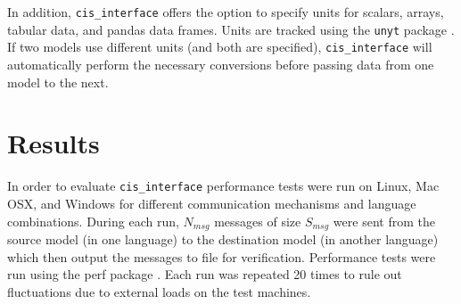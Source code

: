 \documentclass[journal]{IEEEtran}
\newcommand{\cis}{{\tt cis\_interface}{}}
\begin{document}
%
In addition, {\cis} offers the option to specify units for scalars, arrays, tabular data, and pandas data frames. Units are tracked using the {\tt unyt} package \citep{Goldbaum2018}. If two models use different units (and both are specified), {\cis} will automatically perform the necessary conversions before passing data from one model to the next.

\section{Results}\label{S:results}
%
In order to evaluate {\cis} performance tests were run on Linux, Mac OSX, and Windows for different communication mechanisms and language combinations. During each run, $N_{msg}$ messages of size $S_{msg}$ were sent from the source model (in one language) to the destination model (in another language) which then output the messages to file for verification. Performance tests were run using the perf package \citep{Stinner2018}. Each run was repeated 20 times to rule out fluctuations due to external loads on the test machines.

\end{document}
